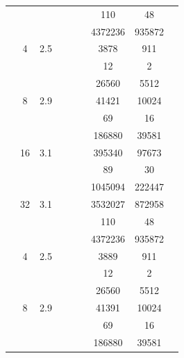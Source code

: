 \begin{table}[htbp]
\begin{tabular}{l S[table-format=3.0] S[table-format=4.1] l S[table-format=6.0] S[table-format=6.0] S[table-format=6.0] S[table-format=5.0] S[table-format=2.0]}
     &  &  &  & {\text{---}} & {\text{---}} & 110 & 48 & {\text{---}} \\
     &  &  &  & {\text{---}} & {\text{---}} & 4372236 & 935872 & {\text{---}} \\
    \midrule
     & 4 & 2.5 &  & {\text{---}} & {\text{---}} & 3878 & 911 & {\text{---}} \\
     &  &  &  & {\text{---}} & {\text{---}} & 12 & 2 & {\text{---}} \\
     &  &  &  & {\text{---}} & {\text{---}} & 26560 & 5512 & {\text{---}} \\
     & 8 & 2.9 &  & {\text{---}} & {\text{---}} & 41421 & 10024 & {\text{---}} \\
     &  &  &  & {\text{---}} & {\text{---}} & 69 & 16 & {\text{---}} \\
     &  &  &  & {\text{---}} & {\text{---}} & 186880 & 39581 & {\text{---}} \\
     & 16 & 3.1 &  & {\text{---}} & {\text{---}} & 395340 & 97673 & {\text{---}} \\
     &  &  &  & {\text{---}} & {\text{---}} & 89 & 30 & {\text{---}} \\
     &  &  &  & {\text{---}} & {\text{---}} & 1045094 & 222447 & {\text{---}} \\
     & 32 & 3.1 &  & {\text{---}} & {\text{---}} & 3532027 & 872958 & {\text{---}} \\
     &  &  &  & {\text{---}} & {\text{---}} & 110 & 48 & {\text{---}} \\
     &  &  &  & {\text{---}} & {\text{---}} & 4372236 & 935872 & {\text{---}} \\
    \midrule
     & 4 & 2.5 &  & {\text{---}} & {\text{---}} & 3889 & 911 & {\text{---}} \\
     &  &  &  & {\text{---}} & {\text{---}} & 12 & 2 & {\text{---}} \\
     &  &  &  & {\text{---}} & {\text{---}} & 26560 & 5512 & {\text{---}} \\
     & 8 & 2.9 &  & {\text{---}} & {\text{---}} & 41391 & 10024 & {\text{---}} \\
     &  &  &  & {\text{---}} & {\text{---}} & 69 & 16 & {\text{---}} \\
     &  &  &  & {\text{---}} & {\text{---}} & 186880 & 39581 & {\text{---}} \\

\end{tabular}
\end{table}
